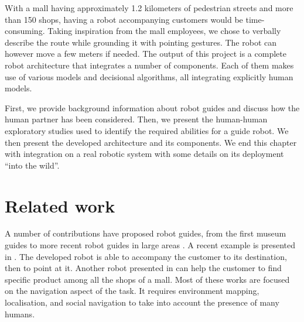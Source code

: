 With a mall having approximately 1.2 kilometers of pedestrian streets and more than 150 shops, having a robot accompanying customers would be time-consuming. Taking inspiration from the mall employees, we chose to verbally describe the route while grounding it with pointing gestures. The robot can however move a few meters if needed. %
The output of this project is a complete robot architecture that integrates a number of components. Each of them makes use of various models and decisional algorithms, all integrating explicitly human models.

First, we provide background information about robot guides and discuss how the human partner has been considered. Then, we present the human-human exploratory studies used to identify the required abilities for a guide robot. We then present the developed architecture and its components. We end this chapter with integration on a real robotic system with some details on its deployment ``into the wild''.

\section{Related work}

A number of contributions have proposed robot guides, from the first museum guides \cite{burgard_1999_museum, siegwart_2003_robox, clodic_2006_rackham} to more recent robot guides in large areas \cite{bauer_2009_autonomous, triebel_2016_spencer}. A recent example is presented in \cite{chen_2017_robots}. The developed robot is able to accompany the customer to its destination, then to point at it. Another robot presented in \cite{gross_2009_toomas} can help the customer to find specific product among all the shops of a mall. Most of these works are focused on the navigation aspect of the task. It requires environment mapping, localisation, and social navigation to take into account the presence of many humans.

